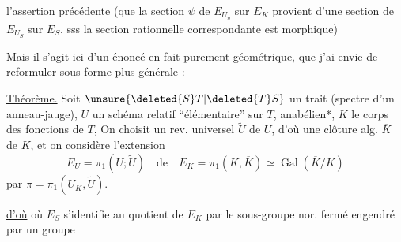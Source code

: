 l'assertion précédente (que la section $\psi$ de $E_{U_\eta}$ sur $E_K$ provient d'une section de $E_{U_S}$ sur $E_S$, sss la section rationnelle correspondante est morphique)

Mais il s'agit ici d'un énoncé en fait purement géométrique, que j'ai envie de reformuler sous forme plus générale :

\uline{Théorème.}  Soit $\unsure{\deleted{S}T|\deleted{T}S}$ un trait (spectre d'un anneau-jauge), $U$ un schéma relatif ``élémentaire'' sur $T$, anabélien*, $K$ le corps des fonctions de $T$, On choisit un rev. universel $\widetilde U$ de $U$, d'où une clôture alg. $\overline K$ de $K$, et on considère l'extension
\[
E_U=\pi_1(U;\widetilde U)\quad\text{de}\quad E_K=\pi_1(K,\overline K)\simeq\operatorname{Gal}(\overline K/K)
\]
par $\pi=\pi_1(U_{\overline K},\widetilde U)$.   \unsure{\deleted{,}|,} 

\uline{d'où}
où $E_S$ s'identifie au quotient de $E_K$ par le sous-groupe nor. fermé engendré par un groupe
